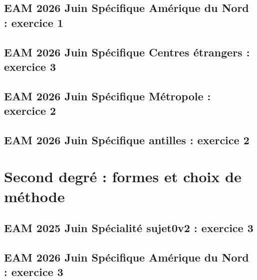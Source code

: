 \documentclass[lang=fr,edition=teacher,layout=sheet]{mxbook}
\begin{document}
\begingroup\endgroup
\par\bigskip
{}\subsection*{EAM 2026 Juin Spécifique Amérique du Nord : exercice 1}
\begingroup\endgroup
\par\bigskip
{}\subsection*{EAM 2026 Juin Spécifique Centres étrangers : exercice 3}
\begingroup\endgroup
\par\bigskip
{}\subsection*{EAM 2026 Juin Spécifique Métropole : exercice 2}
\begingroup\endgroup
\par\bigskip
{}\subsection*{EAM 2026 Juin Spécifique antilles : exercice 2}
\begingroup\endgroup
\par\bigskip
\clearpage\section*{Second degré : formes et choix de méthode}
\subsection*{EAM 2025 Juin Spécialité sujet0v2 : exercice 3}
\begingroup\endgroup
\par\bigskip
{}\subsection*{EAM 2026 Juin Spécifique Amérique du Nord : exercice 3}
\end{document}
